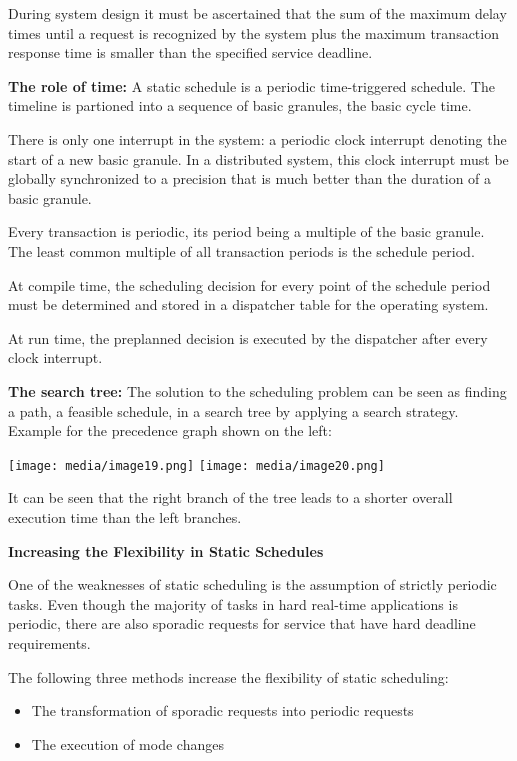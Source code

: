 During system design it must be ascertained that the sum of the maximum
delay times until a request is recognized by the system plus the maximum
transaction response time is smaller than the specified service
deadline.

\textbf{The role of time:} A static schedule is a periodic
time-triggered schedule. The timeline is partioned into a sequence of
basic granules, the basic cycle time.

There is only one interrupt in the system: a periodic clock interrupt
denoting the start of a new basic granule. In a distributed system, this
clock interrupt must be globally synchronized to a precision that is
much better than the duration of a basic granule.

Every transaction is periodic, its period being a multiple of the basic
granule. The least common multiple of all transaction periods is the
schedule period.

At compile time, the scheduling decision for every point of the schedule
period must be determined and stored in a dispatcher table for the
operating system.

At run time, the preplanned decision is executed by the dispatcher after
every clock interrupt.

\textbf{The search tree:} The solution to the scheduling problem can be
seen as finding a path, a feasible schedule, in a search tree by
applying a search strategy. Example for the precedence graph shown on
the left:

\texttt{[image: media/image19.png]}
\texttt{[image: media/image20.png]}

It can be seen that the right branch of the tree leads to a shorter
overall execution time than the left branches.

\textbf{Increasing the Flexibility in Static Schedules}

One of the weaknesses of static scheduling is the assumption of strictly
periodic tasks. Even though the majority of tasks in hard real-time
applications is periodic, there are also sporadic requests for service
that have hard deadline requirements.

The following three methods increase the flexibility of static
scheduling:

\begin{itemize}
\item
  The transformation of sporadic requests into periodic requests
\item
  The execution of mode changes
\end{itemize}


